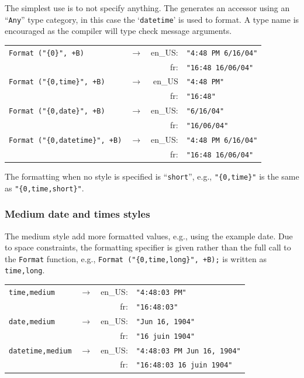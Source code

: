 The simplest use is to not specify anything.  The generates an accessor
using an ``\texttt{Any}'' type category, in this case the `\texttt{datetime}'
is used to format.  A type name is encouraged as the compiler will type
check message arguments.
\begin{center}
\begin{tabular}{llrl}
\verb|Format ("{0}", +B)| & $\rightarrow$ &
                              en\_US: & \verb|"4:48 PM 6/16/04"|\\
                          & & fr: & \verb|"16:48 16/06/04"|\\
\verb|Format ("{0,time}", +B)| & $\rightarrow$ &
                              en\_US & \verb|"4:48 PM"|\\
                              & & fr: & \verb|"16:48"|\\
\verb|Format ("{0,date}", +B)| & $\rightarrow$ &
                              en\_US: & \verb|"6/16/04"|\\
                              & & fr: & \verb|"16/06/04"|\\
\verb|Format ("{0,datetime}", +B)| & $\rightarrow$ &
                              en\_US: & \verb|"4:48 PM 6/16/04"|\\
                              & & fr: & \verb|"16:48 16/06/04"|
\end{tabular}
\end{center}
The formatting when no style is specified is ``\texttt{short}'', e.g.,
\verb|"{0,time}"| is the same as \verb|"{0,time,short}"|.

\subsubsection{Medium date and times styles}

The medium style add more formatted values, e.g., using the example
date.  Due to space constraints, the formatting specifier
is given rather than the full call to the \verb|Format| function, e.g.,
\verb|Format ("{0,time,long}", +B);| is written as \verb|time,long|.
\begin{center}
\begin{tabular}{llrl}
\verb|time,medium| & $\rightarrow$ &
                        en\_US: & \verb|"4:48:03 PM"|\\
                     & & fr: & \verb|"16:48:03"|\\
\verb|date,medium| & $\rightarrow$ &
                        en\_US: & \verb|"Jun 16, 1904"|\\
                     & & fr: & \verb|"16 juin 1904"|\\
\verb|datetime,medium| & $\rightarrow$ &
                        en\_US: & \verb|"4:48:03 PM Jun 16, 1904"|\\
                     & & fr: & \verb|"16:48:03 16 juin 1904"|
\end{tabular}
\end{center}

